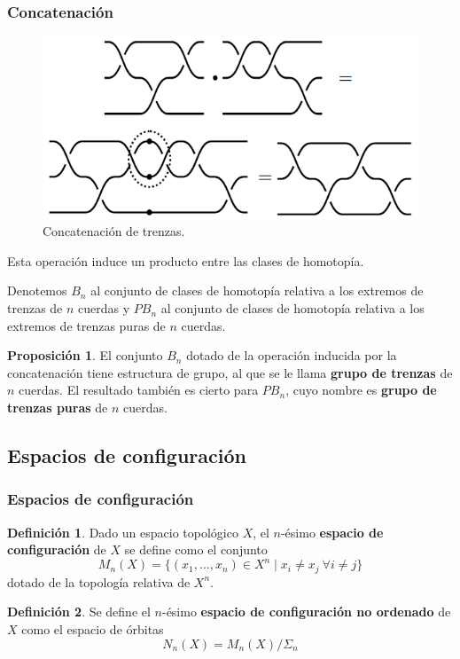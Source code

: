 \documentclass{beamer}
\theoremstyle{definition}
\newtheorem{defi}{Definición}
\newtheorem{prop}[teorema]{Proposición}
\begin{document}
\begin{frame}
\frametitle{Concatenación}
\begin{figure}[h!]
\includegraphics[scale=0.5]{Imagenes/Diapconca}
\caption{Concatenación de trenzas.}
\end{figure}
Esta operación induce un producto entre las clases de homotopía.
\end{frame}

\begin{frame}
Denotemos $B_n$ al conjunto de clases de homotopía relativa a los extremos de trenzas de $n$ cuerdas y $PB_n$ al conjunto de clases de homotopía relativa a los extremos de trenzas puras de $n$ cuerdas.

\begin{prop}
El conjunto $B_n$ dotado de la operación inducida por la concatenación tiene estructura de grupo, al que se le llama \textbf{grupo de trenzas} de $n$ cuerdas. El resultado también es cierto para $PB_n$, cuyo nombre es \textbf{grupo de trenzas puras} de $n$ cuerdas. 
\end{prop}
\end{frame}


\subsection{Espacios de configuración}

\begin{frame}
\frametitle{Espacios de configuración}
\begin{defi}
Dado un espacio topológico $X$, el $n$-ésimo \textbf{espacio de configuración} de $X$ se define como el conjunto
$$M_n(X)=\{(x_1,\dots,x_n)\in X^n\mid x_i\neq x_j\ \forall i\neq j\}$$
dotado de la topología relativa de $X^n$.
\end{defi}
\begin{defi}
Se define el $n$-ésimo \textbf{espacio de configuración no ordenado} de $X$ como el espacio de órbitas
$$N_n(X)=M_n(X)/\Sigma_n$$
\end{defi}
\end{frame}
\end{document}
